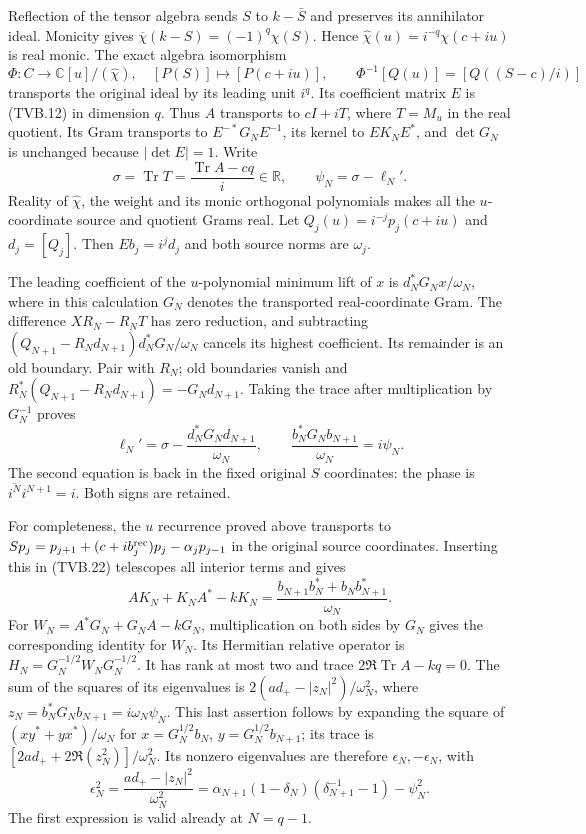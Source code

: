 \documentclass[11pt]{article}
\newcommand{\C}{\mathbb C}
\newcommand{\R}{\mathbb R}
\newcommand{\tr}{\operatorname{Tr}}
\begin{document}
Reflection of the tensor algebra sends $S$ to $k-\bar S$ and
preserves its annihilator ideal. Monicity gives
$\overline\chi(k-S)=(-1)^q\chi(S)$. Hence
$\widehat\chi(u)=i^{-q}\chi(c+iu)$ is real monic. The exact
algebra isomorphism
\[
 \Phi:C\longrightarrow\C[u]/(\widehat\chi),\quad
 [P(S)]\longmapsto[P(c+iu)],\qquad
 \Phi^{-1}[Q(u)]=[Q((S-c)/i)]
 \tag{TVB.25}
\]
transports the original ideal by its leading unit $i^q$.
Its coefficient matrix $E$ is (TVB.12) in dimension $q$.
Thus $A$ transports to $cI+iT$, where $T=M_u$ in the real
quotient. Its Gram transports to $E^{-*}G_NE^{-1}$,
its kernel to $EK_NE^*$, and $\det G_N$ is unchanged because
$|\det E|=1$. Write
\[
 \sigma=\tr T=\frac{\tr A-cq}{i}\in\R,
 \qquad\psi_N=\sigma-\ell_N'.
\]
Reality of $\widehat\chi$, the weight and its monic orthogonal
polynomials makes all the $u$-coordinate source and quotient
Grams real. Let $Q_j(u)=i^{-j}p_j(c+iu)$ and $d_j=[Q_j]$.
Then $Eb_j=i^jd_j$ and both source norms are $\omega_j$.

The leading coefficient of the $u$-polynomial minimum lift of
$x$ is $d_N^*G_Nx/\omega_N$, where in this calculation $G_N$
denotes the transported real-coordinate Gram. The difference
$XR_N-R_NT$ has zero reduction, and subtracting
$(Q_{N+1}-R_Nd_{N+1})d_N^*G_N/\omega_N$ cancels its highest
coefficient. Its remainder is an old boundary. Pair with $R_N$;
old boundaries vanish and
$R_N^*(Q_{N+1}-R_Nd_{N+1})=-G_Nd_{N+1}$.
Taking the trace after multiplication by $G_N^{-1}$ proves
\[
 \ell_N'=\sigma-
           \frac{d_N^*G_Nd_{N+1}}{\omega_N},\qquad
 \frac{b_N^*G_Nb_{N+1}}{\omega_N}=i\psi_N.
 \tag{TVB.26}
\]
The second equation is back in the fixed original $S$ coordinates:
the phase is $\overline{i^N}i^{N+1}=i$. Both signs are retained.

For completeness, the $u$ recurrence proved above transports to
$Sp_j=p_{j+1}+(c+ib_j^{\rm rec})p_j
-\alpha_jp_{j-1}$ in the original source coordinates.
Inserting this in (TVB.22) telescopes all interior terms and gives
\[
 AK_N+K_NA^*-kK_N
 =\frac{b_{N+1}b_N^*+b_Nb_{N+1}^*}{\omega_N}.
\]
For $W_N=A^*G_N+G_NA-kG_N$, multiplication on both sides by
$G_N$ gives the corresponding identity for $W_N$.
Its Hermitian relative operator is
$H_N=G_N^{-1/2}W_NG_N^{-1/2}$.
It has rank at most two and trace
$2\Re\tr A-kq=0$. The sum of the squares of its eigenvalues
is $2(ad_+-|z_N|^2)/\omega_N^2$, where
$z_N=b_N^*G_Nb_{N+1}=i\omega_N\psi_N$.
This last assertion follows by expanding the square of
$(xy^*+yx^*)/\omega_N$ for
$x=G_N^{1/2}b_N$, $y=G_N^{1/2}b_{N+1}$; its trace is
$[2ad_++2\Re(z_N^2)]/\omega_N^2$.
Its nonzero eigenvalues are therefore $\epsilon_N,-\epsilon_N$,
with
\[
 \epsilon_N^2=\frac{ad_+-|z_N|^2}{\omega_N^2}
 =\alpha_{N+1}(1-\delta_N)(\delta_{N+1}^{-1}-1)-\psi_N^2.
 \tag{TVB.27}
\]
The first expression is valid already at $N=q-1$.
\end{document}
